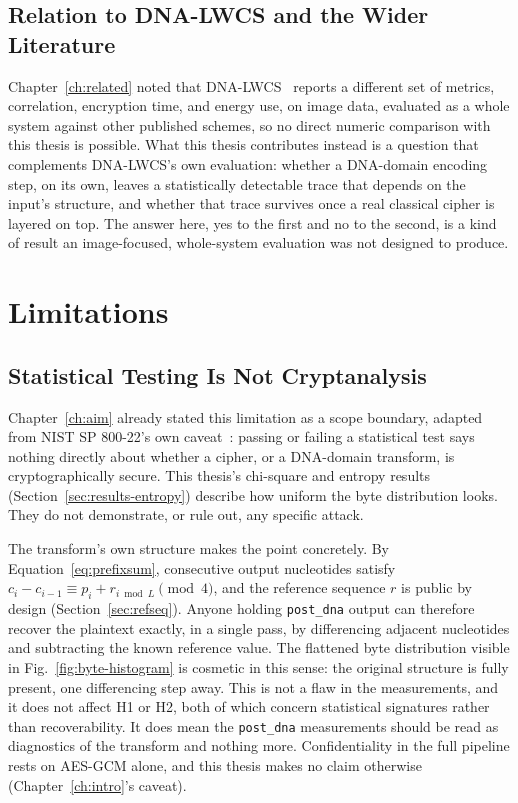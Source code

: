 \documentclass[12pt,a4paper,twoside]{report}
\numberwithin{equation}{chapter}
\begin{document}
\section{Relation to DNA-LWCS and the Wider Literature}
Chapter~\ref{ch:related} noted that DNA-LWCS~\cite{aqeel2025} reports a
different set of metrics, correlation, encryption time, and energy
use, on image data, evaluated as a whole system against other published
schemes, so no direct numeric comparison with this thesis is possible.
What this thesis contributes instead is a question that complements
DNA-LWCS's own evaluation: whether a DNA-domain encoding step, on its
own, leaves a statistically detectable trace that depends on the
input's structure, and whether that trace survives once a real
classical cipher is layered on top. The answer here, yes to the first
and no to the second, is a kind of result an image-focused,
whole-system evaluation was not designed to produce.

\chapter{Limitations}
\label{ch:limitations}

\section{Statistical Testing Is Not Cryptanalysis}
\label{sec:limits-not-cryptanalysis}
Chapter~\ref{ch:aim} already stated this limitation as a scope
boundary, adapted from NIST SP 800-22's own caveat~\cite{nist80022}:
passing or failing a statistical test says nothing directly about
whether a cipher, or a DNA-domain transform, is cryptographically
secure. This thesis's chi-square and entropy results
(Section~\ref{sec:results-entropy}) describe how uniform the byte
distribution looks. They do not demonstrate, or rule out, any specific
attack.

The transform's own structure makes the point concretely. By
Equation~\ref{eq:prefixsum}, consecutive output nucleotides satisfy
$c_i - c_{i-1} \equiv p_i + r_{i \bmod L} \pmod 4$, and the reference
sequence $r$ is public by design (Section~\ref{sec:refseq}). Anyone
holding \texttt{post\_dna} output can therefore recover the plaintext
exactly, in a single pass, by differencing adjacent nucleotides and
subtracting the known reference value. The flattened byte distribution
visible in Fig.~\ref{fig:byte-histogram} is cosmetic in this sense: the
original structure is fully present, one differencing step away. This
is not a flaw in the measurements, and it does not affect H1 or H2,
both of which concern statistical signatures rather than
recoverability. It does mean the \texttt{post\_dna} measurements should
be read as diagnostics of the transform and nothing more.
Confidentiality in the full pipeline rests on AES-GCM alone, and this
thesis makes no claim otherwise (Chapter~\ref{ch:intro}'s caveat).
\end{document}
